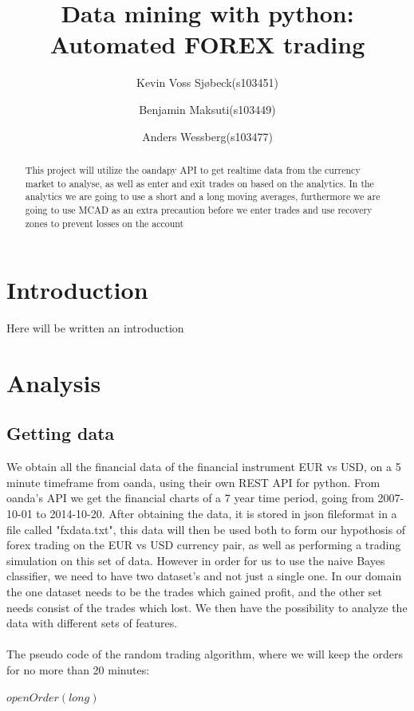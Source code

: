 \documentclass[10pt]{IEEEtran}
\title{Data mining with python: \\Automated FOREX trading}
\author{
	Kevin Voss Sjøbeck(s103451)\\
	\and
	Benjamin Maksuti(s103449)\\
	\and
	Anders Wessberg(s103477)
}
\begin{document}
\maketitle

\begin{abstract}
This project will utilize the oandapy API to get realtime data from the currency market to analyse, as well as enter and exit trades on based on the analytics. In the analytics we are going to use a short and a long moving averages, furthermore we are going to use MCAD as an extra precaution before we enter trades and use recovery zones to prevent losses on the account
\end{abstract}

\section{Introduction}
Here will be written an introduction


\section{Analysis}

\subsection{Getting data}
We obtain all the financial data of the financial instrument EUR vs USD, on a 5 minute timeframe from oanda, using their own REST API for python. From oanda's API we get the financial charts of a 7 year time period, going from 2007-10-01 to 2014-10-20. After obtaining the data, it is stored in json fileformat in a file called "fxdata.txt", this data will then be used both to form our hypothosis of forex trading on the EUR vs USD currency pair, as well as performing a trading simulation on this set of data. However in order for us to use the naive Bayes classifier, we need to have two dataset's and not just a single one. In our domain the one dataset needs to be the trades which gained profit, and the other set needs consist of the trades which lost. We then have the possibility to analyze the data with different sets of features.\\
\\
The pseudo code of the random trading algorithm, where we will keep the orders for no more than 20 minutes:

\begin{center}
\begin{algorithmic}
    	\State $openOrder(long)$	    
	\EndIf
		\Else
		\EndIf
	\EndFor
\EndWhile
{}
\end{algorithmic}
\end{center}
\end{document}
